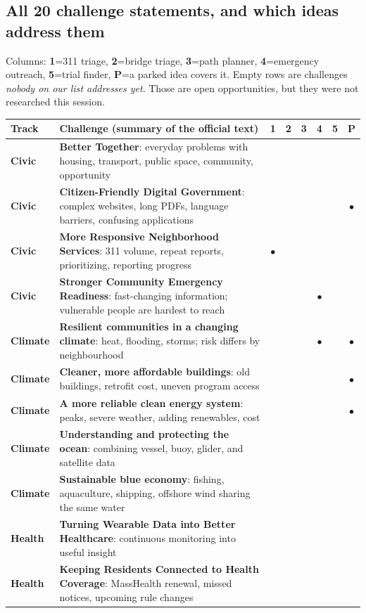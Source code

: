 \documentclass[11pt]{article}
\newcommand{\tagC}{\textcolor{civic}{\textbf{Civic}}}
\newcommand{\tagE}{\textcolor{clim}{\textbf{Climate}}}
\newcommand{\tagH}{\textcolor{health}{\textbf{Health}}}
\newcommand{\yes}{\textcolor{okgreen}{\textbf{$\bullet$}}}
\begin{document}
\subsection{All 20 challenge statements, and which ideas address them}
Columns: \textbf{1}=311 triage, \textbf{2}=bridge triage, \textbf{3}=path planner,
\textbf{4}=emergency outreach, \textbf{5}=trial finder, \textbf{P}=a parked idea covers it.
Empty rows are challenges \emph{nobody on our list addresses yet}. Those are open
opportunities, but they were not researched this session.

\begin{longtable}{@{}L{1.6cm} L{8.3cm} c c c c c c@{}}
\toprule
\textbf{Track} & \textbf{Challenge (summary of the official text)} & \textbf{1} & \textbf{2} & \textbf{3} & \textbf{4} & \textbf{5} & \textbf{P}\\
\midrule
\endhead
\tagC & \textbf{Better Together}: everyday problems with housing, transport, public space, community, opportunity &&&&&&\\
\tagC & \textbf{Citizen-Friendly Digital Government}: complex websites, long PDFs, language barriers, confusing applications &&&&&& \yes\\
\tagC & \textbf{More Responsive Neighborhood Services}: 311 volume, repeat reports, prioritizing, reporting progress & \yes &&&&&\\
\tagC & \textbf{Stronger Community Emergency Readiness}: fast-changing information; vulnerable people are hardest to reach &&&& \yes &&\\
\tagE & \textbf{Resilient communities in a changing climate}: heat, flooding, storms; risk differs by neighbourhood &&&& \yes && \yes\\
\tagE & \textbf{Cleaner, more affordable buildings}: old buildings, retrofit cost, uneven program access &&&&&& \yes\\
\tagE & \textbf{A more reliable clean energy system}: peaks, severe weather, adding renewables, cost &&&&&& \yes\\
\tagE & \textbf{Understanding and protecting the ocean}: combining vessel, buoy, glider, and satellite data &&&&&&\\
\tagE & \textbf{Sustainable blue economy}: fishing, aquaculture, shipping, offshore wind sharing the same water &&&&&&\\
\tagH & \textbf{Turning Wearable Data into Better Healthcare}: continuous monitoring into useful insight &&&&&&\\
\tagH & \textbf{Keeping Residents Connected to Health Coverage}: MassHealth renewal, missed notices, upcoming rule changes &&&&&&\\

\end{longtable}
\end{document}

